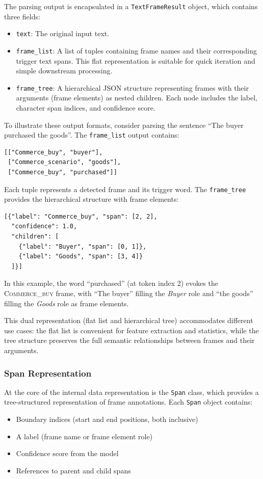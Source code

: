 The parsing output is encapsulated in a \texttt{TextFrameResult} object, which contains three fields:
\begin{itemize}
    \item \texttt{text}: The original input text.
    \item \texttt{frame\_list}: A list of tuples containing frame names and their corresponding trigger text spans. This flat representation is suitable for quick iteration and simple downstream processing.
    \item \texttt{frame\_tree}: A hierarchical JSON structure representing frames with their arguments (frame elements) as nested children. Each node includes the label, character span indices, and confidence score.
\end{itemize}

To illustrate these output formats, consider parsing the sentence ``The buyer purchased the goods''. The \texttt{frame\_list} output contains:
\begin{lstlisting}
[["Commerce_buy", "buyer"],
 ["Commerce_scenario", "goods"],
 ["Commerce_buy", "purchased"]]
\end{lstlisting}

Each tuple represents a detected frame and its trigger word. The \texttt{frame\_tree} provides the hierarchical structure with frame elements:
\begin{lstlisting}
[{"label": "Commerce_buy", "span": [2, 2],
  "confidence": 1.0,
  "children": [
    {"label": "Buyer", "span": [0, 1]},
    {"label": "Goods", "span": [3, 4]}
  ]}]
\end{lstlisting}

In this example, the word ``purchased'' (at token index 2) evokes the \textsc{Commerce\_buy} frame, with ``The buyer'' filling the \textit{Buyer} role and ``the goods'' filling the \textit{Goods} role as frame elements.

This dual representation (flat list and hierarchical tree) accommodates different use cases: the flat list is convenient for feature extraction and statistics, while the tree structure preserves the full semantic relationships between frames and their arguments.

\subsubsection{Span Representation}

At the core of the internal data representation is the \texttt{Span} class, which provides a tree-structured representation of frame annotations. Each \texttt{Span} object contains:
\begin{itemize}
    \item Boundary indices (start and end positions, both inclusive)
    \item A label (frame name or frame element role)
    \item Confidence score from the model
    \item References to parent and child spans
\end{itemize}

